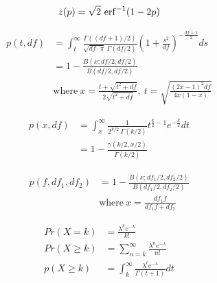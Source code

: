 \begin{align*} 
    z(p) = \sqrt{2}~{\rm erf}^{-1}(1-2p)
\end{align*}

\begin{align*} 
    p(t,df) &= \int_t^{\infty}\frac{\Gamma((df+1)/2)}{\sqrt{df\cdot\pi}~\Gamma(df/2)}\left(1+\frac{s^2}{df}\right)^{-\frac{df+1}{2}}ds\\
    &= 1-\frac{B(x;df/2,df/2)}{B(df/2,df/2)} \\
    &\text{where}~x =\frac{t+\sqrt{t^2+df}}{2\sqrt{t^2+df}},~t=\sqrt{\frac{(2x-1)^2df}{4x(1-x)}}
\end{align*}

\begin{align*} 
    p(x,df) &= \int_x^{\infty}\frac{1}{2^{k/2}~\Gamma(k/2)}t^{\frac{k}{2}-1}e^{-\frac{k}{2}}dt\\
    &= 1-\frac{\gamma(k/2,x/2)}{\Gamma(k/2)}
\end{align*}

\begin{align*} 
    p(f,df_1,df_2) &= 1-\frac{B(x;df_1/2,df_2/2)}{B(df_1/2,df_2/2)} \\
    &\text{where}~x =\frac{df_1f}{df_1f+df_2}
\end{align*}


\begin{align*} 
    Pr(X=k) &= \frac{\lambda^ke^{-\lambda}}{k!} \\
    Pr(X\geq k) &= \sum_{n=k}^{\infty}\frac{\lambda^ne^{-\lambda}}{n!} \\
    p(X\geq k) &= \int_{k}^{\infty}\frac{\lambda^te^{-\lambda}}{\Gamma(t+1)}dt
\end{align*}

